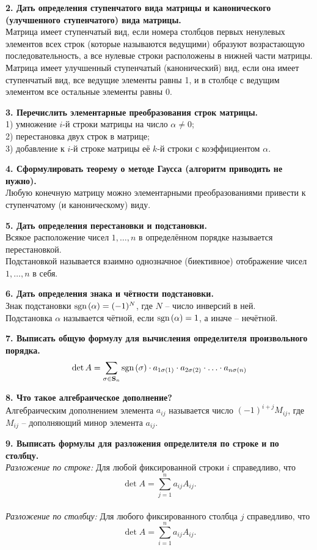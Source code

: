 \documentclass[11pt,a4paper]{article}
\newcommand{\Sgn}[1]{\mathrm{sgn}\hspace{0.5mm}#1}
\begin{document}
\textbf{2. Дать определения ступенчатого вида матрицы и канонического (улучшенного ступенчатого) вида матрицы.\\}
Матрица имеет ступенчатый вид, если номера столбцов первых ненулевых элементов всех строк (которые называются ведущими) образуют возрастающую последовательность, а все нулевые строки расположены в нижней части матрицы.\\
Матрица имеет улучшенный ступенчатый (канонический) вид, если она имеет ступенчатый вид, все ведущие элементы равны 1, и в столбце с ведущим элементом все остальные элементы равны 0.

\textbf{3. Перечислить элементарные преобразования строк матрицы.\\}
1) умножение $i$-й строки матрицы на число $\alpha \neq 0$;\\
2) перестановка двух строк в матрице;\\
3) добавление к $i$-й строке матрицы её $k$-й строки с коэффициентом $\alpha$.

\textbf{4. Сформулировать теорему о методе Гаусса (алгоритм приводить не нужно).\\}
Любую конечную матрицу можно элементарными преобразованиями привести к ступенчатому (и каноническому) виду.

\textbf{5. Дать определения перестановки и подстановки.\\}
Всякое расположение чисел $1, \hdots, n$ в определённом порядке называется перестановкой.\\
Подстановкой называется взаимно однозначное (биективное) отображение чисел $1, \hdots, n$ в себя.

\textbf{6. Дать определения знака и чётности подстановки.\\}
Знак подстановки $\Sgn ( \alpha ) = (-1)^N$, где $N$ -- число инверсий в ней.\\
Подстановка $\alpha$ называется чётной, если $\Sgn ( \alpha ) = 1$, а иначе -- нечётной.
\pagebreak

\textbf{7. Выписать общую формулу для вычисления определителя произвольного порядка.}
$$\det A = \sum_{ \sigma \in \mathbf{S}_n } \Sgn ( \sigma ) \cdot a_{1 \sigma(1)} \cdot a_{2 \sigma(2)} \cdot \hdots \cdot a_{n \sigma(n)}$$

\textbf{8. Что такое алгебраическое дополнение?\\}
Алгебраическим дополнением элемента $a_{ij}$ называется число $(-1)^{i+j} M_{ij}$, где $M_{ij}$ -- дополняющий минор элемента $a_{ij}$.

\textbf{9. Выписать формулы для разложения определителя по строке и по 
столбцу.\\}
\textit{Разложение по строке:} Для любой фиксированной строки $i$ справедливо, что $$\det A = \sum_{j = 1}^n a_{ij} A_{ij}.$$\\
\textit{Разложение по столбцу:} Для любого фиксированного столбца $j$ справедливо, что $$\det A = \sum_{i = 1}^n a_{ij} A_{ij}.$$
\end{document}
